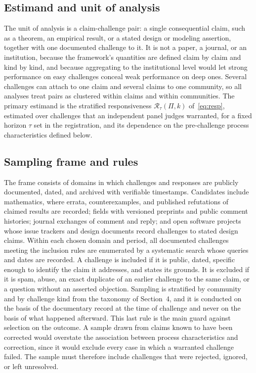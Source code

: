 \documentclass[11pt]{article}
\theoremstyle{remark}
\begin{document}
\subsection{Estimand and unit of analysis}

The unit of analysis is a claim-challenge pair: a single consequential claim, such as a theorem, an empirical result, or a stated design or modeling assertion, together with one documented challenge to it. It is not a paper, a journal, or an institution, because the framework's quantities are defined claim by claim and kind by kind, and because aggregating to the institutional level would let strong performance on easy challenges conceal weak performance on deep ones. Several challenges can attach to one claim and several claims to one community, so all analyses treat pairs as clustered within claims and within communities. The primary estimand is the stratified responsiveness $\mathcal R_\tau(\Pi,k)$ of~\eqref{eq:resp}, estimated over challenges that an independent panel judges warranted, for a fixed horizon $\tau$ set in the registration, and its dependence on the pre-challenge process characteristics defined below.

\subsection{Sampling frame and rules}

The frame consists of domains in which challenges and responses are publicly documented, dated, and archived with verifiable timestamps. Candidates include mathematics, where errata, counterexamples, and published refutations of claimed results are recorded; fields with versioned preprints and public comment histories; journal exchanges of comment and reply; and open software projects whose issue trackers and design documents record challenges to stated design claims. Within each chosen domain and period, all documented challenges meeting the inclusion rules are enumerated by a systematic search whose queries and dates are recorded. A challenge is included if it is public, dated, specific enough to identify the claim it addresses, and states its grounds. It is excluded if it is spam, abuse, an exact duplicate of an earlier challenge to the same claim, or a question without an asserted objection. Sampling is stratified by community and by challenge kind from the taxonomy of Section~4, and it is conducted on the basis of the documentary record at the time of challenge and never on the basis of what happened afterward. This last rule is the main guard against selection on the outcome. A sample drawn from claims known to have been corrected would overstate the association between process characteristics and correction, since it would exclude every case in which a warranted challenge failed. The sample must therefore include challenges that were rejected, ignored, or left unresolved.
\end{document}

